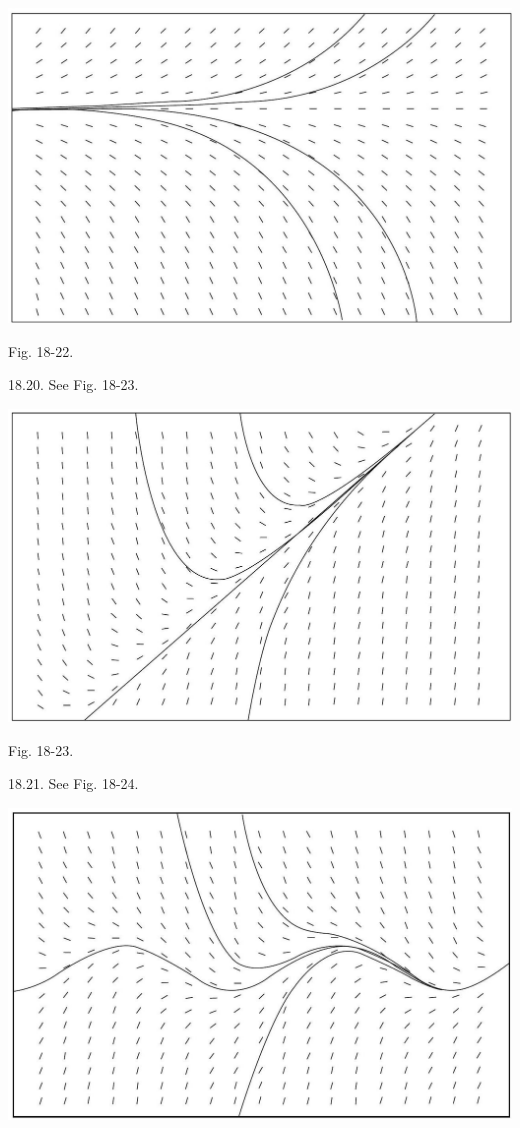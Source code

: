 \documentclass[10pt]{article}
\begin{document}
\begin{center}
\includegraphics[max width=\textwidth]{2024_04_03_5bb5b4275a64cb9887d1g-372(1)}
\end{center}

Fig. 18-22.

18.20. See Fig. 18-23.

\begin{center}
\includegraphics[max width=\textwidth]{2024_04_03_5bb5b4275a64cb9887d1g-373}
\end{center}

Fig. 18-23.

18.21. See Fig. 18-24.

\begin{center}
\includegraphics[max width=\textwidth]{2024_04_03_5bb5b4275a64cb9887d1g-373(1)}
\end{center}
\end{document}
